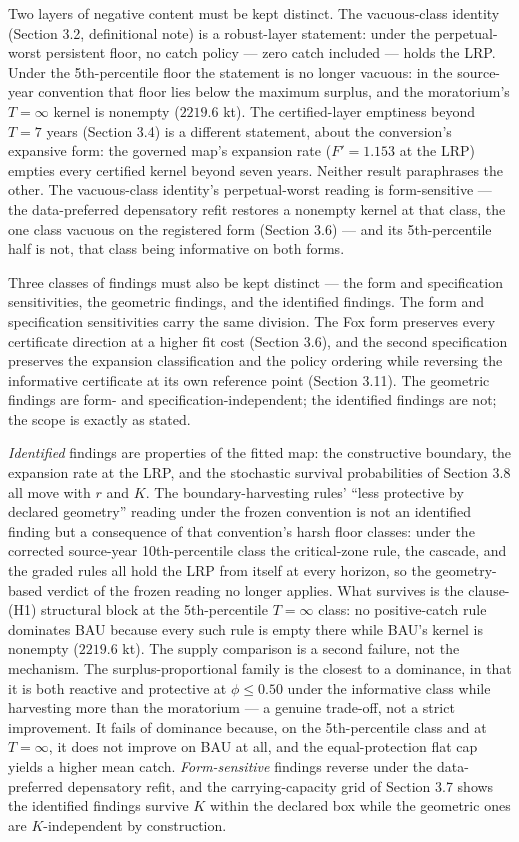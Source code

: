 \documentclass[11pt]{article}
\begin{document}
Two layers of negative content must be kept distinct. The vacuous-class
identity (Section 3.2, definitional note) is a robust-layer statement:
under the perpetual-worst persistent floor, no catch policy --- zero
catch included --- holds the LRP. Under the 5th-percentile floor the
statement is no longer vacuous: in the source-year convention that floor
lies below the maximum surplus, and the moratorium's \(T=\infty\) kernel
is nonempty (\(2219.6\) kt). The certified-layer emptiness beyond
\(T = 7\) years (Section 3.4) is a different statement, about the
conversion's expansive form: the governed map's expansion rate
(\(F' = 1.153\) at the LRP) empties every certified kernel beyond seven
years. Neither result paraphrases the other. The vacuous-class
identity's perpetual-worst reading is form-sensitive --- the
data-preferred depensatory refit restores a nonempty kernel at that
class, the one class vacuous on the registered form (Section 3.6) ---
and its 5th-percentile half is not, that class being informative on both
forms.

Three classes of findings must also be kept distinct --- the form and
specification sensitivities, the geometric findings, and the identified
findings. The form and specification sensitivities carry the same
division. The Fox form preserves every certificate direction at a higher
fit cost (Section 3.6), and the second specification preserves the
expansion classification and the policy ordering while reversing the
informative certificate at its own reference point (Section 3.11). The
geometric findings are form- and specification-independent; the
identified findings are not; the scope is exactly as stated.

\emph{Identified} findings are properties of the fitted map: the
constructive boundary, the expansion rate at the LRP, and the stochastic
survival probabilities of Section 3.8 all move with \(r\) and \(K\). The
boundary-harvesting rules' ``less protective by declared geometry''
reading under the frozen convention is not an identified finding but a
consequence of that convention's harsh floor classes: under the
corrected source-year 10th-percentile class the critical-zone rule, the
cascade, and the graded rules all hold the LRP from itself at every
horizon, so the geometry-based verdict of the frozen reading no longer
applies. What survives is the clause-(H1) structural block at the
5th-percentile \(T=\infty\) class: no positive-catch rule dominates BAU
because every such rule is empty there while BAU's kernel is nonempty
(\(2219.6\) kt). The supply comparison is a second failure, not the
mechanism. The surplus-proportional family is the closest to a
dominance, in that it is both reactive and protective at
\(\phi \le 0.50\) under the informative class while harvesting more than
the moratorium --- a genuine trade-off, not a strict improvement. It
fails of dominance because, on the 5th-percentile class and at
\(T=\infty\), it does not improve on BAU at all, and the
equal-protection flat cap yields a higher mean catch.
\emph{Form-sensitive} findings reverse under the data-preferred
depensatory refit, and the carrying-capacity grid of Section 3.7 shows
the identified findings survive \(K\) within the declared box while the
geometric ones are \(K\)-independent by construction.
\end{document}
